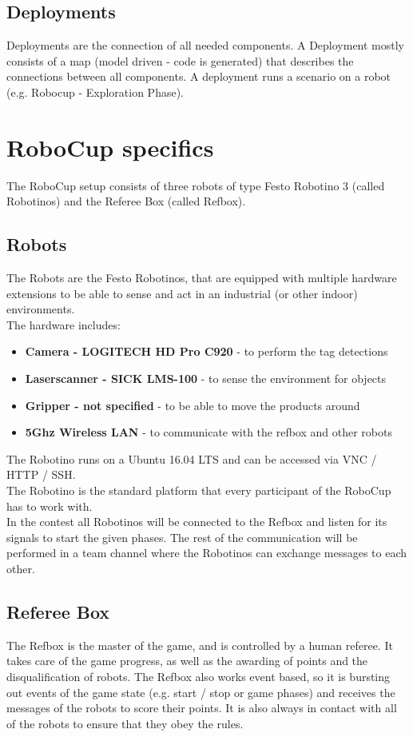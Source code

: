 \subsection{Deployments}
\label{subsec:Deployments}
Deployments are the connection of all needed components.
A Deployment mostly consists of a map (model driven - code is generated) that describes the connections between all components.
A deployment runs a scenario on a robot (e.g. Robocup - Exploration Phase).

\section{RoboCup specifics}
The RoboCup setup consists of three robots of type Festo Robotino 3 (called Robotinos) and the Referee Box (called Refbox).

\subsection{Robots}
The Robots are the Festo Robotinos, that are equipped with multiple hardware extensions to be able to sense and act
in an industrial (or other indoor) environments.\\
The hardware includes:
\begin{itemize}
    \item \textbf{Camera - LOGITECH HD Pro C920} - to perform the tag detections
    \item \textbf{Laserscanner - SICK LMS-100} - to sense the environment for objects
    \item \textbf{Gripper -  not specified} - to be able to move the products around%
    \item \textbf{5Ghz Wireless LAN} - to communicate with the refbox and other robots
\end{itemize}

The Robotino runs on a Ubuntu 16.04 LTS and can be accessed via VNC / HTTP / SSH.\\

The Robotino is the standard platform that every participant of the RoboCup has to work with.\\
In the contest all Robotinos will be connected to the Refbox and listen for its signals to start the given phases.
The rest of the communication will be performed in a team channel where the Robotinos can exchange messages to each other.

\subsection{Referee Box}
The Refbox is the master of the game, and is controlled by a human referee. It takes care of the game progress, as well as the awarding of points and the disqualification of robots.
The Refbox also works event based, so it is bursting out events of the game state (e.g. start / stop or game phases) and receives the messages of the robots to score their points.
It is also always in contact with all of the robots to ensure that they obey the rules.
